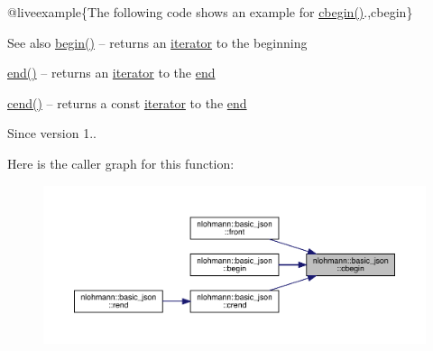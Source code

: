 @liveexample\{The following code shows an example for {\ttfamily \mbox{\hyperlink{classnlohmann_1_1basic__json_ad865d6c291b237ae508d5cb2146b5877}{cbegin()}}}.,cbegin\}

\begin{DoxySeeAlso}{See also}
\mbox{\hyperlink{classnlohmann_1_1basic__json_a0ff28dac23f2bdecee9564d07f51dcdc}{begin()}} -- returns an \mbox{\hyperlink{classnlohmann_1_1basic__json_a099316232c76c034030a38faa6e34dca}{iterator}} to the beginning 

\mbox{\hyperlink{classnlohmann_1_1basic__json_a13e032a02a7fd8a93fdddc2fcbc4763c}{end()}} -- returns an \mbox{\hyperlink{classnlohmann_1_1basic__json_a099316232c76c034030a38faa6e34dca}{iterator}} to the \mbox{\hyperlink{classnlohmann_1_1basic__json_a13e032a02a7fd8a93fdddc2fcbc4763c}{end}} 

\mbox{\hyperlink{classnlohmann_1_1basic__json_a8dba7b7d2f38e6b0c614030aa43983f6}{cend()}} -- returns a const \mbox{\hyperlink{classnlohmann_1_1basic__json_a099316232c76c034030a38faa6e34dca}{iterator}} to the \mbox{\hyperlink{classnlohmann_1_1basic__json_a13e032a02a7fd8a93fdddc2fcbc4763c}{end}}
\end{DoxySeeAlso}
\begin{DoxySince}{Since}
version 1.. 
\end{DoxySince}
Here is the caller graph for this function\+:
\nopagebreak
\begin{figure}[H]
\begin{center}
\leavevmode
\includegraphics[width=350pt]{classnlohmann_1_1basic__json_ad865d6c291b237ae508d5cb2146b5877_icgraph}
\end{center}
\end{figure}
\mbox{\label{classnlohmann_1_1basic__json_a8dba7b7d2f38e6b0c614030aa43983f6}} 
